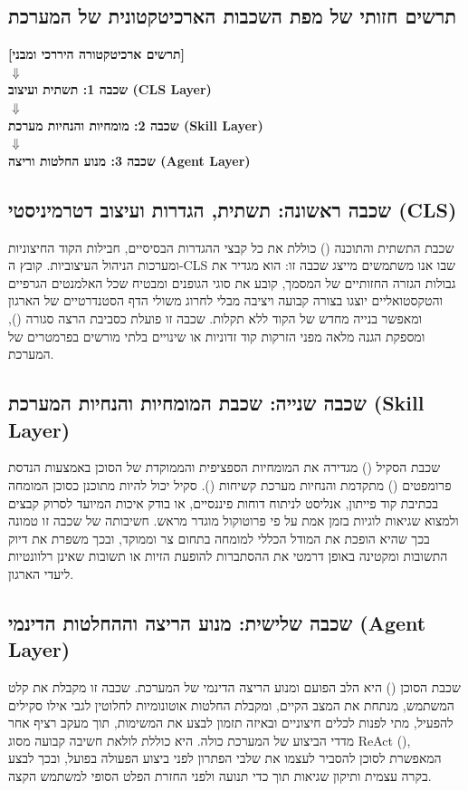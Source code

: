 \documentclass{hebrew-academic-template}
\begin{document}
\subsection{תרשים חזותי של מפת השכבות הארכיטקטונית של המערכת}
\begin{notebox}
\centering
\textbf{[תרשים ארכיטקטורה היררכי ומבני]} \\
$\Downarrow$ \\
\textbf{שכבה 1: תשתית ועיצוב (CLS Layer)} \\
$\Downarrow$ \\
\textbf{שכבה 2: מומחיות והנחיות מערכת (Skill Layer)} \\
$\Downarrow$ \\
\textbf{שכבה 3: מנוע החלטות וריצה (Agent Layer)}
\end{notebox}

\subsection{שכבה ראשונה: תשתית, הגדרות ועיצוב דטרמיניסטי (CLS)}
שכבת התשתית והתוכנה () כוללת את כל קבצי ההגדרות הבסיסיים, חבילות הקוד החיצוניות ומערכות הניהול העיצוביות. קובץ ה-CLS שבו אנו משתמשים מייצג שכבה זו: הוא מגדיר את גבולות הגזרה החזותיים של המסמך, קובע את סוגי הגופנים ומבטיח שכל האלמנטים הגרפיים והטקסטואליים יוצגו בצורה קבועה ויציבה מבלי לחרוג משולי הדף הסטנדרטיים של הארגון ומאפשר בנייה מחדש של הקוד ללא תקלות. שכבה זו פועלת כסביבת הרצה סגורה (), ומספקת הגנה מלאה מפני הזרקות קוד זדוניות או שינויים בלתי מורשים בפרמטרים של המערכת.

\subsection{שכבה שנייה: שכבת המומחיות והנחיות המערכת (Skill Layer)}
שכבת הסקיל () מגדירה את המומחיות הספציפית והממוקדת של הסוכן באמצעות הנדסת פרומפטים () מתקדמת והנחיות מערכת קשיחות (). סקיל יכול להיות מתוכנן כסוכן המומחה בכתיבת קוד פייתון, אנליסט לניתוח דוחות פיננסיים, או בודק איכות המיועד לסרוק קבצים ולמצוא שגיאות לוגיות בזמן אמת על פי פרוטוקול מוגדר מראש. חשיבותה של שכבה זו טמונה בכך שהיא הופכת את המודל הכללי למומחה בתחום צר וממוקד, ובכך משפרת את דיוק התשובות ומקטינה באופן דרמטי את ההסתברות להופעת הזיות או תשובות שאינן רלוונטיות ליעדי הארגון.

\subsection{שכבה שלישית: מנוע הריצה וההחלטות הדינמי (Agent Layer)}
שכבת הסוכן () היא הלב הפועם ומנוע הריצה הדינמי של המערכת. שכבה זו מקבלת את קלט המשתמש, מנתחת את המצב הקיים, ומקבלת החלטות אוטונומיות לחלוטין לגבי אילו סקילים להפעיל, מתי לפנות לכלים חיצוניים ובאיזה תזמון לבצע את המשימות, תוך מעקב רציף אחר מדדי הביצוע של המערכת כולה. היא כוללת לולאת חשיבה קבועה מסוג ReAct (), המאפשרת לסוכן להסביר לעצמו את שלבי הפתרון לפני ביצוע הפעולה בפועל, ובכך לבצע בקרה עצמית ותיקון שגיאות תוך כדי תנועה ולפני החזרת הפלט הסופי למשתמש הקצה.
\end{document}
